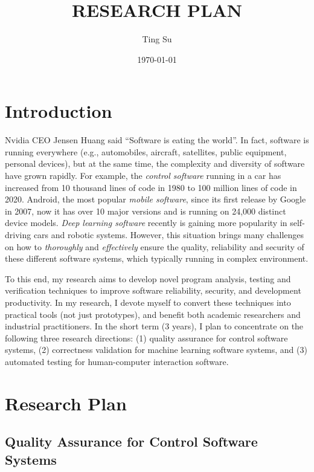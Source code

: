 \documentclass[a4paper]{article}
\title{RESEARCH PLAN}
\author{Ting Su}
\date{\today}
\begin{document}
\fontsize{12}{15}
\selectfont
\maketitle

\section{Introduction}

Nvidia CEO Jensen Huang said ``Software is eating the world''. In fact, software is running everywhere (e.g., automobiles, aircraft, satellites, public equipment, personal devices), but at the same time,
the complexity and diversity of software have grown rapidly.
For example, the \emph{control software} running in a car has increased from 10 thousand lines of code in 1980 to 100 million lines of code in 2020.
Android, the most popular \emph{mobile software}, since its first release by Google in 2007, now it has over 10 major versions and is running on 24,000 distinct  device models. 
\emph{Deep learning software} recently is gaining more popularity in self-driving cars and robotic systems.
However, this situation brings many challenges on how to \emph{thoroughly} and \emph{effectively} ensure the quality, reliability and security of these different software systems, which typically running in complex environment.

To this end, my research aims to develop novel program analysis, testing and verification techniques to improve software reliability, security, and development productivity. In my research, I devote myself to convert these techniques into practical tools (not just prototypes), and benefit both academic researchers and industrial practitioners. 
In the short term (3 years), I plan to concentrate on the following three research directions: 
(1) quality assurance for control software systems, (2) correctness validation for machine learning software systems, and (3) automated testing for human-computer interaction software.

\section{Research Plan}

\subsection{Quality Assurance for Control Software Systems}
\end{document}
